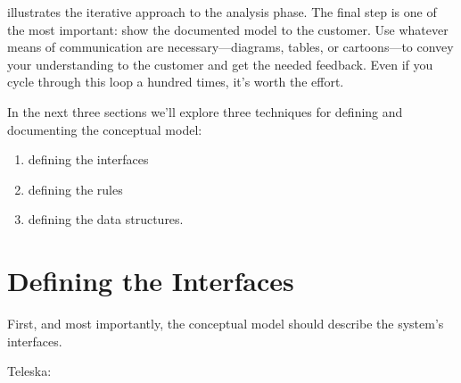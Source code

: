  illustrates the iterative approach to the analysis phase.
The final step is one of the most important: show the documented model
to the customer. Use whatever means of communication are
necessary---diagrams, tables, or cartoons---to convey your understanding to
the customer and get the needed feedback. Even if you cycle through this
loop a hundred times, it's worth the effort.

In the next three sections we'll explore three techniques for defining
and documenting the conceptual model:

\begin{enumerate}
\item defining the interfaces
\item defining the rules
\item defining the data structures.
\end{enumerate}

\section{Defining the Interfaces}

\begin{tip}
First, and most importantly, the conceptual model should describe the
system's interfaces.
\end{tip}

\bigskip\blackline{2ex}
\noindent Teleska:

